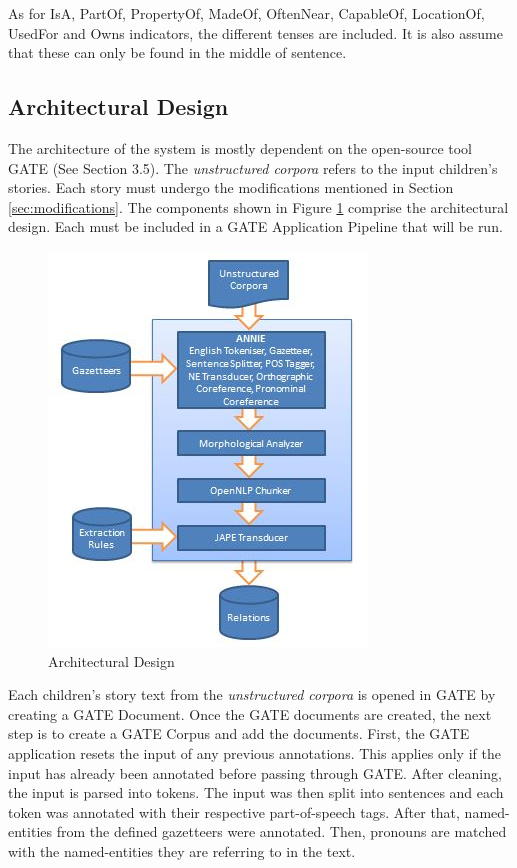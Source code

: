 As for IsA, PartOf, PropertyOf, MadeOf, OftenNear, CapableOf, LocationOf, UsedFor and Owns indicators, the different tenses are included. It is also assume that these can only be found in the middle of sentence.

\subsection{Architectural Design}
\label{sec:archidesign}

The architecture of the system is mostly dependent on the open-source tool GATE (See Section 3.5). The \textit{unstructured corpora} refers to the input children's stories. Each story must undergo the modifications mentioned in Section \ref{sec:modifications}. The components shown in Figure \ref{fig:archidesign} comprise the architectural design. Each must be included in a GATE Application Pipeline that will be run.

\begin{figure}[h]                %
   \centering                    %
   \includegraphics{archidesign1.jpg}      %
   \caption{Architectural Design}
    \label{fig:archidesign}
\end{figure}

Each children's story text from the \textit{unstructured corpora} is opened in GATE by creating a GATE Document. Once the GATE documents are created, the next step is to create a GATE Corpus and add the documents. First, the GATE application resets the input of any previous annotations. This applies only if the input has already been annotated before passing through GATE. After cleaning, the input is parsed into tokens. The input was then  split into sentences and each token was annotated with their respective part-of-speech tags. After that, named-entities from the defined gazetteers were annotated. Then, pronouns are matched with the named-entities they are referring to in the text. 

